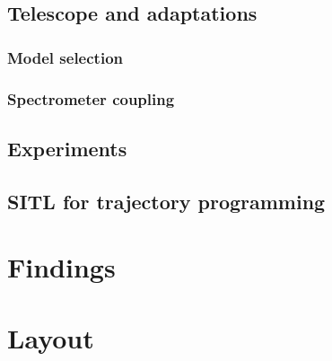 \subsection{Telescope and adaptations}%
\label{sub:telescope_and_adaptations}

\subsubsection{Model selection}%
\label{ssub:model_selection}

\subsubsection{Spectrometer coupling}%
\label{ssub:spectrometer_coupling}

\subsection{Experiments}%
\label{sub:experiments}

\subsection{SITL for trajectory programming}%
\label{sub:sitl_for_trajectory_programming}

\section{Findings}%
\label{sec:findings}

\section{Layout}%
\label{sec:layout}














